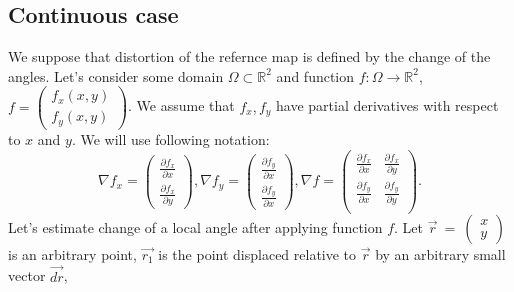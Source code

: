 \documentclass{article}
\newcommand{\vect}{\overrightarrow}
\begin{document}
\subsection{Continuous case}
\label{sec:continuous}
We suppose that distortion of the refernce map is defined by the change of the angles. Let's consider some domain $\Omega \subset \mathbb{R}^2$ and function $f: \Omega \to \mathbb{R}^2$, 
$f = \begin{pmatrix} f_x(x, y) \\ f_y(x, y) \end{pmatrix}$. We assume that $f_x, f_y$ have partial derivatives with respect to $x$ and $y$. We will use following notation:
$$
  \nabla f_x = \begin{pmatrix} \frac{\partial f_x}{\partial x} \\ \frac{\partial f_x}{\partial y} \end{pmatrix}, 
  \nabla f_y = \begin{pmatrix} \frac{\partial f_y}{\partial x} \\ \frac{\partial f_y}{\partial x} \end{pmatrix}, 
  \nabla f = \begin{pmatrix} 
    \frac{\partial f_x}{\partial x} & \frac{\partial f_x}{\partial y} \\
    \frac{\partial f_y}{\partial x} & \frac{\partial f_y}{\partial y} \\
  \end{pmatrix}. 
$$
Let's estimate change of a local angle after applying function $f$. Let $\vect{r}~=~\begin{pmatrix} x \\ y \end{pmatrix}$ is an arbitrary point, $\vect{r_1}$ is the point displaced relative to $\vect{r}$ by an arbitrary 
small vector $\vect{dr}$, 
\end{document}

